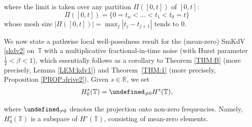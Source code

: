 \documentclass[letterpaper, 11pt,  reqno]{amsart}
\newcommand{\1}{\hspace{0.5mm}\textup{I}\hspace{0.5mm}}
\newcommand{\noi}{\noindent}
\newcommand{\R}{\mathbb{R}}
\newcommand{\T}{\mathbb{T}}
\let\P= \undefined
\newcommand{\P}{\mathbf{P}}
\newcommand{\be}{\beta}
\numberwithin{equation}{section}
\numberwithin{theorem}{section}
\begin{document}
\noi
 where 
 the limit is taken over any partition
 $\Pi([0,t])$  
 of  $[0,t]$\textup{:} 
\[\Pi ([0,t]) = \{0 = t_{n} < \dots < t_1 <  t_0 = t\}\]
whose mesh size 
$|\Pi([0,t])| = \max_{j} |t_j-t_{j+1}|$ 
tends to $0$.












\medskip





We now state 
a  pathwise local well-posedness
result
for the (mean-zero) SmKdV \eqref{skdv2} on~$\T$ with a multiplicative 
fractional-in-time noise (with Hurst parameter $\frac 12 < \be < 1$), 
which essentially 
follows as a corollary to Theorem \ref{THM:B} 
(more precisely, Lemma \ref{LEM:kdv1}) and Theorem~\ref{THM:1}
(more precisely, Proposition \ref{PROP:drive2}).
Given $s \in \R$, we set 
\begin{align}
 H_0^s(\T)= \P_{\ne 0}H^s(\T), 
 \label{hs1}
\end{align}

\noi
where $\P_{\ne 0}$ denotes the projection onto non-zero frequencies.
Namely, 
 $H_0^s(\T)$
is a subspace of  $H^s(\T)$, 
consisting of mean-zero elements.
\end{document}
